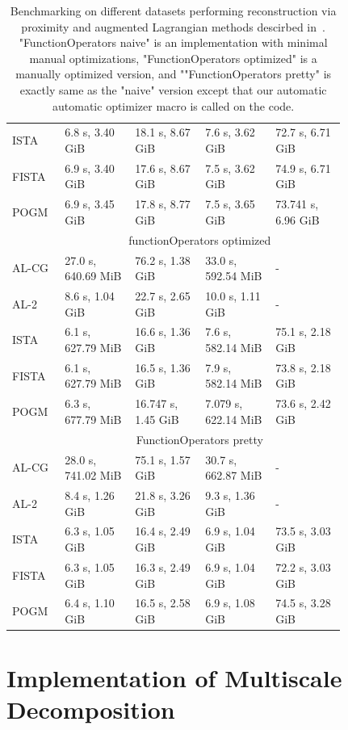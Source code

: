 \begin{table}[]
\begin{tabular}{|p{0.1\linewidth}|p{0.18\linewidth}p{0.18\linewidth}p{0.18\linewidth}p{0.18\linewidth}|}
ISTA & 6.8 s, 3.40 GiB & 18.1 s, 8.67 GiB & 7.6 s, 3.62 GiB & 72.7 s, 6.71 GiB \\
FISTA & 6.9 s, 3.40 GiB & 17.6 s, 8.67 GiB & 7.5 s, 3.62 GiB & 74.9 s, 6.71 GiB \\
POGM & 6.9 s, 3.45 GiB & 17.8 s, 8.77 GiB & 7.5 s, 3.65 GiB & 73.741 s, 6.96 GiB \\ \hline
\multicolumn{1}{|c|}{} & \multicolumn{4}{c|}{functionOperators optimized} \\
AL-CG & 27.0 s, 640.69 MiB & 76.2 s, 1.38 GiB & 33.0 s, 592.54 MiB & - \\
AL-2 & 8.6 s, 1.04 GiB & 22.7 s, 2.65 GiB & 10.0 s, 1.11 GiB & - \\
ISTA & 6.1 s, 627.79 MiB & 16.6 s, 1.36 GiB & 7.6 s, 582.14 MiB & 75.1 s, 2.18 GiB \\
FISTA & 6.1 s, 627.79 MiB & 16.5 s, 1.36 GiB & 7.9 s, 582.14 MiB & 73.8 s, 2.18 GiB \\
POGM & 6.3 s, 677.79 MiB & 16.747 s, 1.45 GiB & 7.079 s, 622.14 MiB & 73.6 s, 2.42 GiB \\ \hline
\multicolumn{1}{|c|}{} & \multicolumn{4}{c|}{FunctionOperators pretty} \\
AL-CG & 28.0 s, 741.02 MiB & 75.1 s, 1.57 GiB & 30.7 s, 662.87 MiB & - \\
AL-2 & 8.4 s, 1.26 GiB & 21.8 s, 3.26 GiB & 9.3 s, 1.36 GiB & - \\
ISTA & 6.3 s, 1.05 GiB & 16.4 s, 2.49 GiB & 6.9 s, 1.04 GiB & 73.5 s, 3.03 GiB \\
FISTA & 6.3 s, 1.05 GiB & 16.3 s, 2.49 GiB & 6.9 s, 1.04 GiB & 72.2 s, 3.03 GiB \\
POGM & 6.4 s, 1.10 GiB & 16.5 s, 2.58 GiB & 6.9 s, 1.08 GiB & 74.5 s, 3.28 GiB \\ \hline
\end{tabular}
\caption{Benchmarking on different datasets performing reconstruction via proximity and augmented Lagrangian methods descirbed in~\cite{lin_efficient_2019}. "FunctionOperators naive" is an implementation with minimal manual optimizations, "FunctionOperators optimized" is a manually optimized version, and ""FunctionOperators pretty" is exactly same as the "naive" version except that our automatic automatic optimizer macro is called on the code.}
\label{tab:lin_fessler}
\end{table}

\section{Implementation of Multiscale Decomposition}


